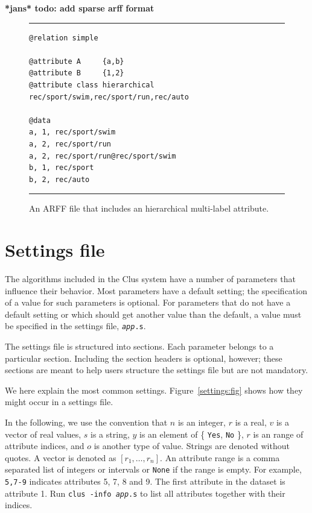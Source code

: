 \documentclass[a4paper]{report}
\begin{document}
\textbf{*jans* todo: add sparse arff format}


\begin{figure}
\hrule
\begin{verbatim}
@relation simple

@attribute A     {a,b}
@attribute B     {1,2}
@attribute class hierarchical rec/sport/swim,rec/sport/run,rec/auto

@data
a, 1, rec/sport/swim
a, 2, rec/sport/run
a, 2, rec/sport/run@rec/sport/swim
b, 1, rec/sport
b, 2, rec/auto
\end{verbatim}
\hrule
\caption{An ARFF file that includes an hierarchical multi-label attribute.}
\label{arffhmc:fig}
\end{figure}

\chapter{Settings file}

The algorithms included in the Clus system have a number of parameters that influence their behavior.  Most parameters have a default setting; the specification of a value for such parameters is optional.  For parameters that do not have a default setting or which should get another value than the default, a value must be specified in the settings file, {\tt {\em app}.s}.

The settings file is structured into sections.  Each parameter belongs to a particular section.  Including the section headers is optional, however; these sections are meant to help users structure the settings file but are not mandatory.

We here explain the most common settings.  Figure~\ref{settings:fig} shows how they might occur in a settings file.

In the following, we use the convention that $n$ is an integer, $r$ is a real, $v$ is a vector of real values, $s$ is a string, $y$ is an element of \{ {\tt Yes}, {\tt No} \}, $r$ is an range of attribute indices, and $o$ is another type of value.  Strings are denoted without quotes. A vector is denoted as $[r_1,\ldots,r_n]$. An attribute range is a comma separated list of integers or intervals or \texttt{None} if the range is empty. For example, {\tt 5,7-9} indicates attributes 5, 7, 8 and 9. The first attribute in the dataset is attribute 1. Run {\tt clus -info {\em app}.s} to list all attributes together with their indices.
\end{document}
